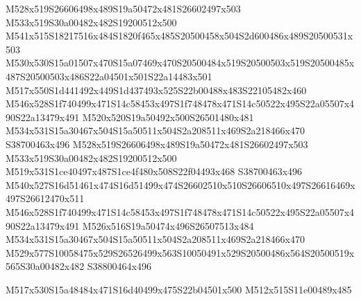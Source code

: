 \documentclass{article}
\begin{document}
\begin{multicols}{2}

M528x519S26606498x489S19a50472x481S26602497x503 M533x519S30a00482x482S19200512x500 M541x515S18217516x484S1820f465x485S20500458x504S2d600486x489S20500531x503 M530x530S15a01507x470S15a07469x470S20500484x519S20500503x519S20500485x487S20500503x486S22a04501x501S22a14483x501 M517x550S1d441492x449S1d437493x525S22b00488x483S22105482x460 M546x528S1f740499x471S14c58453x497S1f748478x471S14c50522x495S22a05507x490S22a13479x491 M520x520S19a50492x500S26501480x481 M534x531S15a30467x504S15a50511x504S2a208511x469S2a218466x470 S38700463x496 M528x519S26606498x489S19a50472x481S26602497x503 M533x519S30a00482x482S19200512x500 M519x531S1ce40497x487S1ce4f480x508S22f04493x468 S38700463x496 M540x527S16d51461x474S16d51499x474S26602510x510S26606510x497S26616469x497S26612470x511 M546x528S1f740499x471S14c58453x497S1f748478x471S14c50522x495S22a05507x490S22a13479x491 M526x516S19a50474x496S26507513x484 M534x531S15a30467x504S15a50511x504S2a208511x469S2a218466x470 M529x577S10058475x529S26526499x563S10050491x529S20500486x564S20500519x565S30a00482x482 S38800464x496

\begin{center}
M517x530S15a48484x471S16d40499x475S22b04501x500 M512x515S11e00489x485 
\end{center}









\end{multicols}
\end{document}
